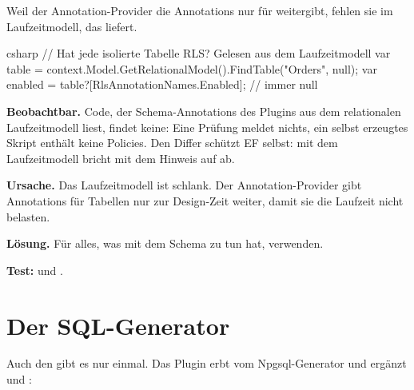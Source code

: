 Weil der Annotation-Provider die Annotations nur für  weitergibt,
fehlen sie im Laufzeitmodell, das  liefert.

\begin{sourcecode}{csharp}
// Hat jede isolierte Tabelle RLS? Gelesen aus dem Laufzeitmodell
var table = context.Model.GetRelationalModel().FindTable("Orders", null);
var enabled = table?[RlsAnnotationNames.Enabled];          // immer null
\end{sourcecode}

\begin{failure}
  \textbf{Beobachtbar.} Code, der Schema-Annotations des Plugins aus dem relationalen
  Laufzeitmodell liest, findet keine: Eine Prüfung meldet nichts, ein selbst erzeugtes Skript
  enthält keine Policies. Den Differ schützt EF selbst:
   mit dem Laufzeitmodell bricht mit dem Hinweis auf
   ab.

  \textbf{Ursache.} Das Laufzeitmodell ist schlank. Der Annotation-Provider gibt Annotations
  für Tabellen nur zur Design-Zeit weiter, damit sie die Laufzeit nicht belasten.

  \textbf{Lösung.} Für alles, was mit dem Schema zu tun hat,
  verwenden.

  \textbf{Test:}
  und .
\end{failure}

\section{Der SQL-Generator}

Auch den  gibt es nur einmal. Das
Plugin erbt vom Npgsql-Generator und ergänzt  und
:

